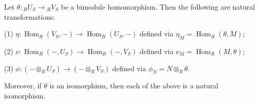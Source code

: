 Let $\theta: {}_R U_S \to {}_R V_S$ be a bimodule homomorphism. Then the following are natural transformations:

(1) $\eta: \operatorname{Hom}_R(V_S, -) \to \operatorname{Hom}_R(U_S, -)$ defined via $\eta_M = \operatorname{Hom}_R(\theta, M)$;

(2) $\nu: \operatorname{Hom}_R(-, U_S) \to \operatorname{Hom}_R(-, V_S)$ defined via $\nu_M = \operatorname{Hom}_R(M, \theta)$;

(3) $\phi: (- \otimes_R U_S) \to (- \otimes_R V_S)$ defined via $\phi_N = N \otimes_R \theta$.

Moreover, if $\theta$ is an isomorphism, then each of the above is a natural isomorphism.
